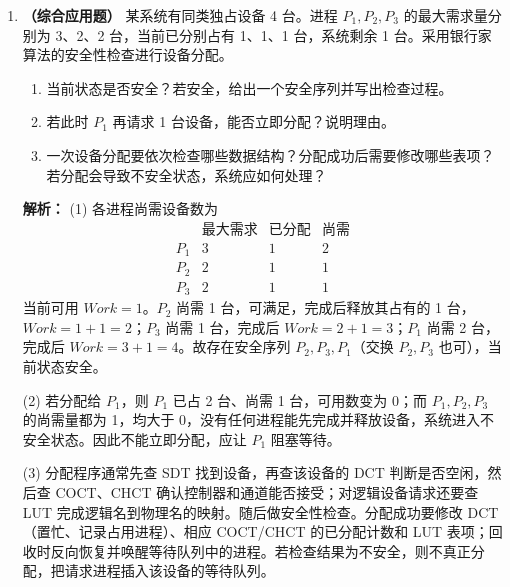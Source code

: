 \begin{enumerate}[resume]
\item \textbf{（综合应用题）} 某系统有同类独占设备 4 台。进程 $P_1,P_2,P_3$ 的最大需求量分别为 3、2、2 台，当前已分别占有 1、1、1 台，系统剩余 1 台。采用银行家算法的安全性检查进行设备分配。
\begin{enumerate}
    \item[(1)] 当前状态是否安全？若安全，给出一个安全序列并写出检查过程。
    \item[(2)] 若此时 $P_1$ 再请求 1 台设备，能否立即分配？说明理由。
    \item[(3)] 一次设备分配要依次检查哪些数据结构？分配成功后需要修改哪些表项？若分配会导致不安全状态，系统应如何处理？
\end{enumerate}

\ifshowsolutions\par\noindent\textbf{解析：}
(1) 各进程尚需设备数为
\[
\begin{array}{c|ccc}
 & \text{最大需求} & \text{已分配} & \text{尚需}\\\hline
P_1 & 3 & 1 & 2\\
P_2 & 2 & 1 & 1\\
P_3 & 2 & 1 & 1
\end{array}
\]
当前可用 $Work=1$。$P_2$ 尚需 1 台，可满足，完成后释放其占有的 1 台，$Work=1+1=2$；$P_3$ 尚需 1 台，完成后 $Work=2+1=3$；$P_1$ 尚需 2 台，完成后 $Work=3+1=4$。故存在安全序列 $P_2,P_3,P_1$（交换 $P_2,P_3$ 也可），当前状态安全。

(2) 若分配给 $P_1$，则 $P_1$ 已占 2 台、尚需 1 台，可用数变为 0；而 $P_1,P_2,P_3$ 的尚需量都为 1，均大于 0，没有任何进程能先完成并释放设备，系统进入不安全状态。因此不能立即分配，应让 $P_1$ 阻塞等待。

(3) 分配程序通常先查 SDT 找到设备，再查该设备的 DCT 判断是否空闲，然后查 COCT、CHCT 确认控制器和通道能否接受；对逻辑设备请求还要查 LUT 完成逻辑名到物理名的映射。随后做安全性检查。分配成功要修改 DCT（置忙、记录占用进程）、相应 COCT/CHCT 的已分配计数和 LUT 表项；回收时反向恢复并唤醒等待队列中的进程。若检查结果为不安全，则不真正分配，把请求进程插入该设备的等待队列。

\else \answerarea[10] \fi

\end{enumerate}
